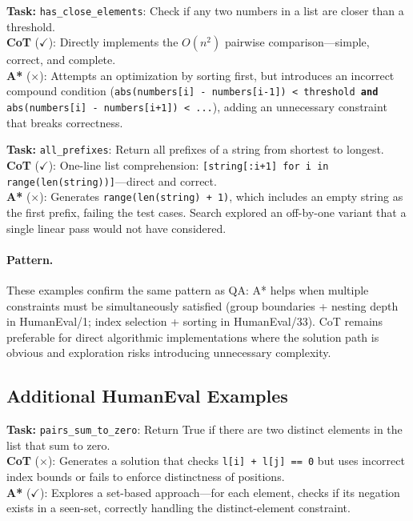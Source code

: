 \documentclass[11pt]{article}
\begin{document}
{{\begin{examplebox}[title=HumanEval/0 --- CoT Correct{,} A* Wrong]
\textbf{Task:} \texttt{has\_close\_elements}: Check if any two numbers in a list are closer than a threshold.\\[4pt]
\textbf{CoT} ($\checkmark$): Directly implements the $O(n^2)$ pairwise comparison---simple, correct, and complete.\\[4pt]
\textbf{A*} ($\times$): Attempts an optimization by sorting first, but introduces an incorrect compound condition (\texttt{abs(numbers[i] - numbers[i-1]) < threshold \textbf{and} abs(numbers[i] - numbers[i+1]) < ...}), adding an unnecessary constraint that breaks correctness.
\end{examplebox}

\begin{examplebox}[title=HumanEval/14 --- CoT Correct{,} A* Wrong]
\textbf{Task:} \texttt{all\_prefixes}: Return all prefixes of a string from shortest to longest.\\[4pt]
\textbf{CoT} ($\checkmark$): One-line list comprehension: \texttt{[string[:i+1] for i in range(len(string))]}---direct and correct.\\[4pt]
\textbf{A*} ($\times$): Generates \texttt{range(len(string) + 1)}, which includes an empty string as the first prefix, failing the test cases. Search explored an off-by-one variant that a single linear pass would not have considered.
\end{examplebox}

\paragraph{Pattern.} These examples confirm the same pattern as QA: A* helps when multiple constraints must be simultaneously satisfied (group boundaries + nesting depth in HumanEval/1; index selection + sorting in HumanEval/33). CoT remains preferable for direct algorithmic implementations where the solution path is obvious and exploration risks introducing unnecessary complexity.

\subsection{Additional HumanEval Examples}

\begin{examplebox}[title=HumanEval/43 --- A* Correct{,} CoT Wrong]
\textbf{Task:} \texttt{pairs\_sum\_to\_zero}: Return True if there are two distinct elements in the list that sum to zero.\\[4pt]
\textbf{CoT} ($\times$): Generates a solution that checks \texttt{l[i] + l[j] == 0} but uses incorrect index bounds or fails to enforce distinctness of positions.\\[4pt]
\textbf{A*} ($\checkmark$): Explores a set-based approach---for each element, checks if its negation exists in a seen-set, correctly handling the distinct-element constraint.
\end{examplebox}

}}
\end{document}
